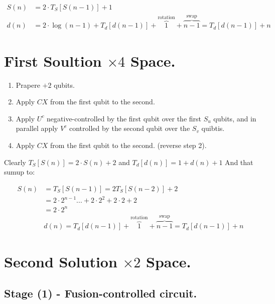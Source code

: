 \documentclass[manuscript,screen,review]{acmart}
\begin{document}
\begin{equation*}
\begin{split} 
S(n) &= 2 \cdot T_{S}[S(n-1)] + 1   \\
d(n) &= 2\cdot \log(n-1) +  T_{d}[d(n-1)] + \overbrace{1}^{ \text{rotation} } + \overbrace{n-1}^{\text{swap}} =  T_{d}[d(n-1)] + n  
\end{split} 
\end{equation*}




\section{First Soultion $\times 4$ Space.}
\begin{enumerate}
  \item Prapere $+2$ qubits.
  \item Apply $CX$ from the first qubit to the second.
  \item Apply $U^{c}$ negative-controlled by the first qubit over the first $S_{u}$ qubits, and in parallel apply $V^{c}$ controlled by the second qubit over the $S_{v}$ quibtis.   
  \item Apply $CX$ from the first qubit to the second. (reverse step 2).
\end{enumerate}
Clearly $T_{S}[S(n)] = 2 \cdot S(n) + 2$ and $T_{d}[d(n)] = 1 + d(n) + 1$ And that sumup to:

\begin{equation*}
\begin{split}
  S(n) &  = T_{S}[S(n-1)] = 2T_{S}[S(n-2)] + 2   \\
  & = 2\cdot 2^{n - 1}...+2\cdot 2^{2} +2\cdot 2 + 2  \\
  & = 2\cdot 2^{n}  \\ 
  & d(n) = T_{d}[d(n-1)] + \overbrace{1}^{ \text{rotation} } + \overbrace{n-1}^{\text{swap}} =  T_{d}[d(n-1)] + n 
\end{split} 
\end{equation*}

\section{Second Solution $\times 2$ Space. }

\subsection{Stage (1) - Fusion-controlled circuit.}
\end{document}

